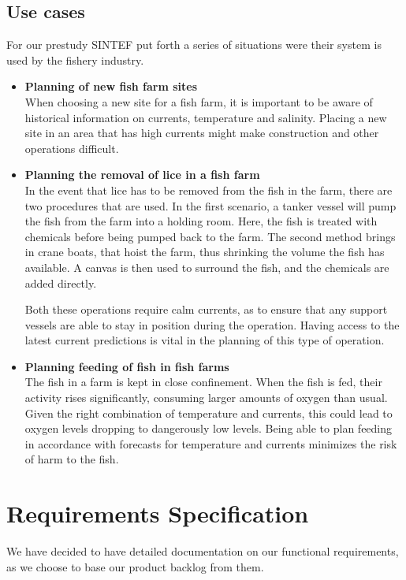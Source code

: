 \documentclass[11pt,a4paper,titlepage,oneside]{report}
\begin{document}
  \subsection{Use cases}
	For our prestudy SINTEF put forth a series of situations were their system is used by the fishery industry. 
	\begin{itemize}
		\item \textbf{Planning of new fish farm sites} \\
		When choosing a new site for a fish farm, it is important to be aware of historical information on currents, temperature and salinity. Placing a new site in an area that has high currents might make construction and other operations difficult.
		\item \textbf{Planning the removal of lice in a fish farm} \\
		In the event that lice has to be removed from the fish in the farm, there are two procedures that are used. In the first scenario, a tanker vessel will pump the fish from the farm into a holding room. Here, the fish is treated with chemicals before being pumped back to the farm. The second method brings in crane boats, that hoist the farm, thus shrinking the volume the fish has available. A canvas is then used to surround the fish, and the chemicals are added directly. 

		Both these operations require calm currents, as to ensure that any support vessels are able to stay in position during the operation. Having access to the latest current predictions is vital in the planning of this type of operation.
		\item \textbf{Planning feeding of fish in fish farms} \\
		The fish in a farm is kept in close confinement. When the fish is fed, their activity rises significantly, consuming larger amounts of oxygen than usual. Given the right combination of temperature and currents, this could lead to oxygen levels dropping to dangerously low levels. Being able to plan feeding in accordance with forecasts for temperature and currents minimizes the risk of harm to the fish.
	\end{itemize}

\section{Requirements Specification}
\label{reqspec}
We have decided to have detailed documentation on our functional requirements, as we choose to base our product backlog from them.
\end{document}
